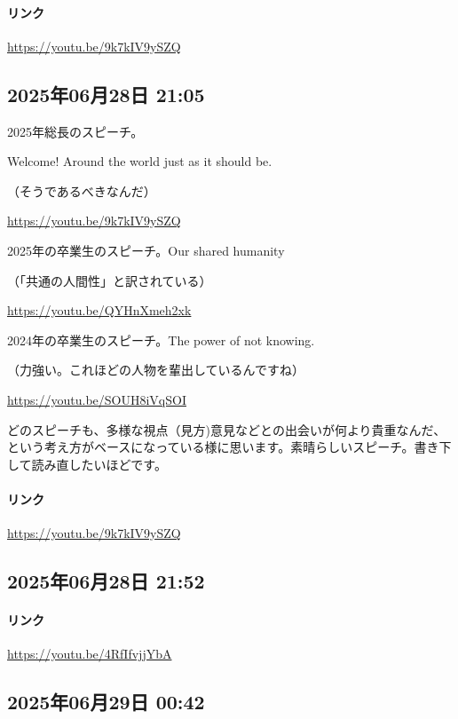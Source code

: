 \paragraph{リンク}
\url{https://youtu.be/9k7kIV9ySZQ}

\subsection*{2025年06月28日 21:05}

2025年総長のスピーチ。

Welcome! Around the world just as it should be.

（そうであるべきなんだ）

\url{https://youtu.be/9k7kIV9ySZQ}

2025年の卒業生のスピーチ。Our shared humanity

（「共通の人間性」と訳されている）

\url{https://youtu.be/QYHnXmeh2xk}

2024年の卒業生のスピーチ。The power of not knowing.

（力強い。これほどの人物を輩出しているんですね）

\url{https://youtu.be/SOUH8iVqSOI}

どのスピーチも、多様な視点（見方)意見などとの出会いが何より貴重なんだ、という考え方がベースになっている様に思います。素晴らしいスピーチ。書き下して読み直したいほどです。

\paragraph{リンク}
\url{https://youtu.be/9k7kIV9ySZQ}

\subsection*{2025年06月28日 21:52}

\paragraph{リンク}
\url{https://youtu.be/4RfIfvjjYbA}

\subsection*{2025年06月29日 00:42}

